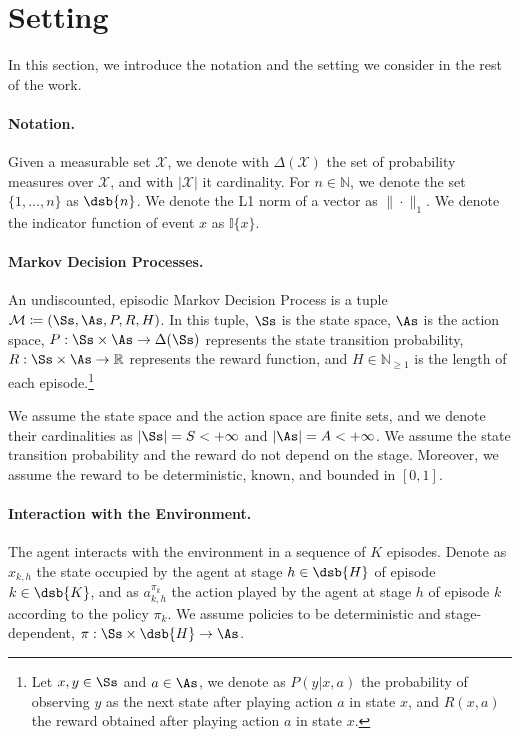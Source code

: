 \section{Setting}
\label{sec:preliminaries}

In this section, we introduce the notation and the setting we consider in the rest of the work.

\paragraph{Notation.}
Given a measurable set $\mathcal{X}$, we denote with $\Delta(\mathcal{X})$ the set of probability measures over $\mathcal{X}$, and with $|\mathcal{X}|$ it cardinality. For $n \in \mathbb{N}$, we denote the set $\{1, \ldots, n\}$ as $\dsb{n}$. We denote the L1 norm of a vector as $\| \cdot \|_1$. We denote the indicator function of event $x$ as $\mathbb{I}\{x\}$.

\paragraph{Markov Decision Processes.}
An undiscounted, episodic Markov Decision Process \citep[MDP, ][]{puterman1990} is a tuple $\mathcal{M} \coloneqq (\Ss, \As, P, R, H)$. In this tuple, $\Ss$ is the state space, $\As$ is the action space, $P : \Ss \times \As \to \Delta(\Ss)$ represents the state transition probability, $R : \Ss \times \As \to \mathbb{R}$ represents the reward function, and $H \in \mathbb{N}_{\geq 1}$ is the length of each episode.\footnote{Let $x, y \in \Ss$ and $a \in \As$, we denote as $P(y|x,a)$ the probability of observing $y$ as the next state after playing action $a$ in state $x$, and $R(x,a)$ the reward obtained after playing action $a$ in state $x$.}

We assume the state space and the action space are finite sets, and we denote their cardinalities as $|\Ss| = S < + \infty$ and $|\As| = A < + \infty$. We assume the state transition probability and the reward do not depend on the stage. Moreover, we assume the reward to be deterministic, known, and bounded in $[0,1]$.

\paragraph{Interaction with the Environment.}
The agent interacts with the environment in a sequence of $K$ episodes. Denote as $x_{k,h}$ the state occupied by the agent at stage $h \in \dsb{H}$ of episode $k \in \dsb{K}$, and as $a_{k,h}^{\pi_k}$ the action played by the agent at stage $h$ of episode $k$ according to the policy $\pi_k$. We assume policies to be deterministic and stage-dependent, \ie $\pi : \Ss \times \dsb{H} \to \As$.

